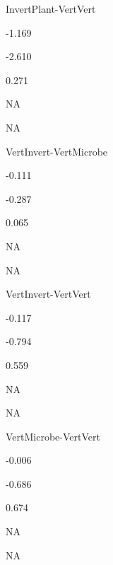 \documentclass[
]{article}
\begin{document}
InvertPlant-VertVert

-1.169

-2.610

0.271

NA

NA

VertInvert-VertMicrobe

-0.111

-0.287

0.065

NA

NA

VertInvert-VertVert

-0.117

-0.794

0.559

NA

NA

VertMicrobe-VertVert

-0.006

-0.686

0.674

NA

NA
\end{document}
